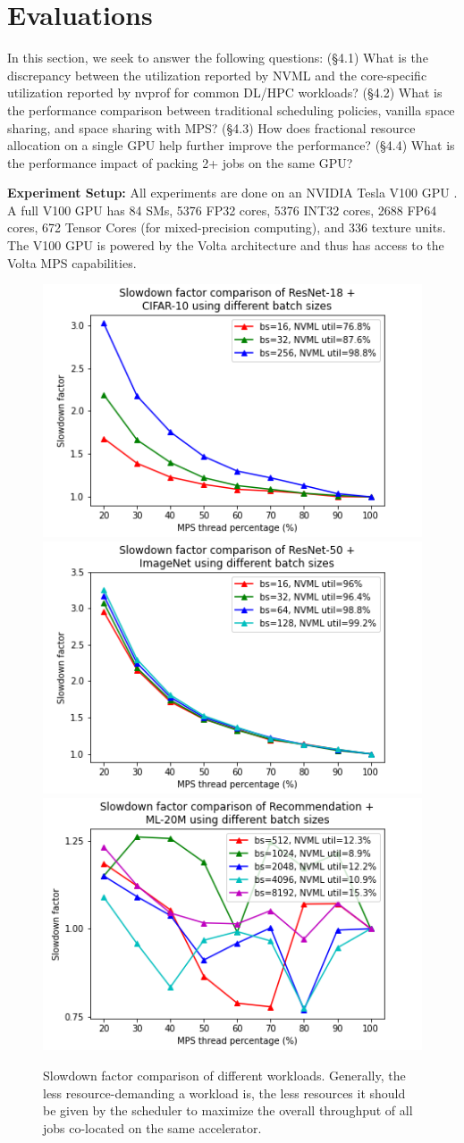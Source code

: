 \documentclass{article}
\begin{document}
\section{Evaluations}



In this section, we seek to answer the following questions: (§4.1) What is the discrepancy between the utilization reported by NVML and the core-specific utilization reported by nvprof for common DL/HPC workloads? (§4.2) What is the performance comparison between traditional scheduling policies, vanilla space sharing, and space sharing with MPS? (§4.3) How does fractional resource allocation on a single GPU help further improve the performance? (§4.4) What is the performance impact of packing 2+ jobs on the same GPU?

\textbf{Experiment Setup: } All experiments are done on an NVIDIA Tesla V100 GPU \cite{v100_architecture}. A full V100 GPU has 84 SMs, 5376 FP32 cores, 5376 INT32 cores, 2688 FP64 cores, 672 Tensor Cores (for mixed-precision computing), and 336 texture units. The V100 GPU is powered by the Volta architecture and thus has access to the Volta MPS capabilities.

\begin{figure}
\label{mps_weights_figure}
    \includegraphics[width=.33\textwidth]{images/fig2_ResNet-18.png}\hfill
    \includegraphics[width=.33\textwidth]{images/fig2_ResNet-50.png}\hfill
    \includegraphics[width=.33\textwidth]{images/fig2_Recommendation.png}\hfill
    \caption{Slowdown factor comparison of different workloads. Generally, the less resource-demanding a workload is, the less resources it should be given by the scheduler to maximize the overall throughput of all jobs co-located on the same accelerator.}
    \label{fig:foobar}
\end{figure}
\end{document}
